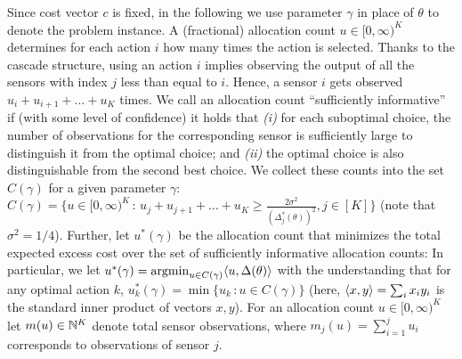 Since cost vector $c$ is fixed, in the following we use parameter $\gamma$ in place of $\theta$ to denote the problem instance.
A (fractional) allocation count $u\in [0,\infty)^K$ determines for each action $i$ how many times the
action is selected.
Thanks to the cascade structure, using an action $i$ implies observing the output of all the sensors with index $j$ less than equal to $i$. Hence, a sensor $i$ gets observed $u_i+u_{i+1}+\dots+u_K$ times.
We call an allocation count ``sufficiently informative'' if (with some level of confidence)
it holds that {\em (i)} for each suboptimal choice, 
the number of observations for the corresponding sensor is sufficiently large to distinguish
it from the optimal choice; and  {\em (ii)}  the optimal choice is also distinguishable from the second best choice.
We collect these counts into the set $C(\gamma)$ for a given parameter $\gamma$:
$C(\gamma) = \{ u\in [0,\infty)^K\,:\, 
u_j+u_{j+1}+\dots+u_K
\ge \frac{2\sigma^2}{(\Delta_j^*(\theta))^2}, j\in [K] \}$
(note that $\sigma^2=1/4$).
Further, let $u^*(\gamma)$
be the allocation count that minimizes the total expected excess cost over the set of sufficiently informative allocation counts:
In particular,  we let $u^*(\gamma) = \operatorname{argmin}_{u\in C(\gamma)} \langle  u, \Delta(\theta)  \rangle$ 
with the understanding that for any optimal action $k$, $u_k^*(\gamma) = \min \{ u_k \,: u\in C(\gamma) \}$ (here, $\langle x,y \rangle = \sum_i x_i y_i$ is the standard inner product of vectors $x,y$).
For an allocation count $u\in [0,\infty)^K$ let $m(u)\in \mathbb{N}^K$ denote total sensor observations, where $m_j(u) = \sum_{i=1}^j u_i$ corresponds to observations of sensor $j$.

